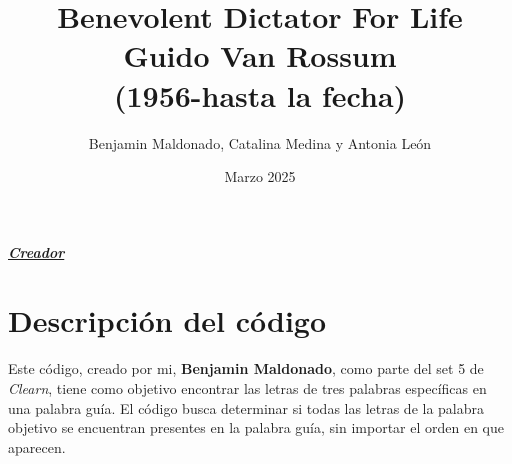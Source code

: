 \documentclass[20pt]{article}
\title{Benevolent Dictator For Life \\ \large Guido Van Rossum \\ \large (1956-hasta la fecha)}
\author{Benjamin Maldonado,
Catalina Medina y
Antonia León}
\date{Marzo 2025}
\begin{document}
\newpage

\centerline{\underline{\LARGE{\textit{\textbf{\textcolor{red!40!black}{Creador}}}}}}
\vspace{0.5 cm} 

\section*{Descripción del código}

Este código, creado por mi, \textbf{Benjamin Maldonado}, como parte del set 5 de \textit{Clearn}, tiene como objetivo encontrar las letras de tres palabras específicas en una palabra guía. El código busca determinar si todas las letras de la palabra objetivo se encuentran presentes en la palabra guía, sin importar el orden en que aparecen.
\end{document}
